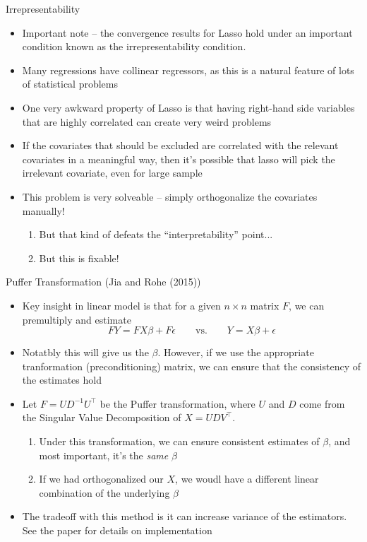   \begin{frame}[allowframebreaks]{Irrepresentability}
    \begin{itemize}
    \item Important note -- the convergence results for Lasso hold under
      an important condition known as the irrepresentability condition.
    \item Many regressions have collinear regressors, as this is a
      natural feature of lots of statistical problems
    \item One very awkward property of Lasso is that having right-hand
      side variables that are highly correlated can create very weird
      problems
    \item If the covariates that should be excluded are correlated with
      the relevant covariates in a meaningful way, then it's possible
      that lasso will pick the irrelevant covariate, even for large
      sample
    \item This problem is very solveable -- simply orthogonalize the covariates manually!
      \begin{enumerate}[-]
      \item But that kind of defeats the ``interpretability'' point...
      \item But this is fixable!
      \end{enumerate}
    \end{itemize}
  \end{frame}
  
  \begin{frame}[allowframebreaks]{Puffer Transformation (Jia and Rohe (2015))}
    \begin{itemize}
    \item Key insight in linear model is that for a given $n \times n$ matrix $F$, we can premultiply and estimate
      $$FY = FX\beta + F\epsilon \qquad \text{vs.} \qquad Y = X\beta + \epsilon  $$
    \item Notatbly this will give us the $\beta$. However, if we use the
      appropriate tranformation (preconditioning) matrix, we can ensure
      that the consistency of the estimates hold
    \item Let $F = UD^{-1}U^\top$ be the Puffer transformation, where $U$
      and $D$ come from the Singular Value Decomposition of $X = UDV^\top$.
      \begin{enumerate}[-]
      \item Under this transformation, we can ensure consistent
        estimates of $\beta$, and most important, it's the \emph{same} $\beta$
      \item If we had orthogonalized our $X$, we woudl have a different
        linear combination of the underlying $\beta$
      \end{enumerate}
    \item The tradeoff with this method is it can increase variance of
      the estimators. See the paper for details on implementation
    \end{itemize}
  \end{frame}
  
